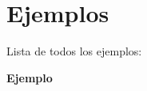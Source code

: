 \section{Ejemplos}
Lista de todos los ejemplos\-:\begin{DoxyCompactItemize}
\item 
{\bf Ejemplo}
\end{DoxyCompactItemize}
